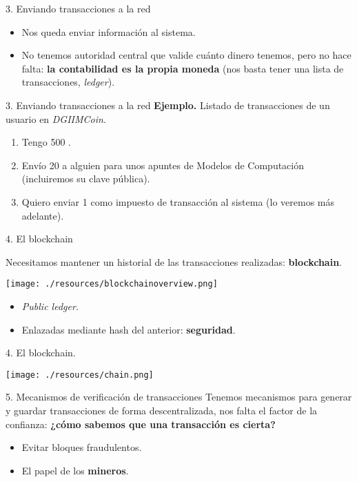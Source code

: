 \documentclass[10pt, xcolor=table]{beamer}
\newcommand\dout{\bgroup \markoverwith{\rule[0.2ex]{0.1pt}{0.4pt}\rule[0.8ex]{0.1pt}{0.4pt}}\ULon}
\def\dout{\bgroup
 \markoverwith{\lower-0.35ex\hbox
 {\kern-.03em\vbox{\hrule width.2em\kern0.45ex\hrule}\kern-.03em}}%
 \ULon}
\begin{document}
\begin{frame}{3. Enviando transacciones a la red}
\begin{itemize}
	\item Nos queda enviar información al sistema.
	\item No tenemos autoridad central que valide cuánto dinero tenemos, pero no hace falta: \textbf{la contabilidad es la propia moneda} (nos basta tener una lista de transacciones, \emph{ledger}).
\end{itemize}
\end{frame}

\begin{frame}{3. Enviando transacciones a la red}
\textbf{Ejemplo.} Listado de transacciones de un usuario en \emph{DGIIMCoin}.
\begin{enumerate}
	\item Tengo 500\dout{D}.
\item Envío 20\dout{D} a alguien para unos apuntes de Modelos de Computación (incluiremos su clave pública).
\item
  Quiero enviar 1\dout{D} como impuesto de transacción al sistema (lo
  veremos más adelante).
\end{enumerate}

\end{frame}

\begin{frame}{4. El blockchain}

Necesitamos mantener un historial de las transacciones realizadas: \textbf{blockchain}.

\begin{center}
	\texttt{[image: ./resources/blockchainoverview.png]}
\end{center}	

\begin{itemize}
	\item \emph{Public ledger.}
	\item Enlazadas mediante hash del anterior: \textbf{seguridad}.
\end{itemize}
\end{frame}

\begin{frame}{4. El blockchain. }
\begin{center}
	\texttt{[image: ./resources/chain.png]}
\end{center}	
\end{frame}

\begin{frame}{5. Mecanismos de verificación de transacciones}
Tenemos mecanismos para generar y guardar transacciones de forma descentralizada, nos
falta el factor de la confianza: \textbf{¿cómo sabemos que una transacción es cierta?}

\begin{itemize}
	\item Evitar bloques fraudulentos.
	\item El papel de los \textbf{mineros}.
\end{itemize}
\end{frame}
\end{document}
